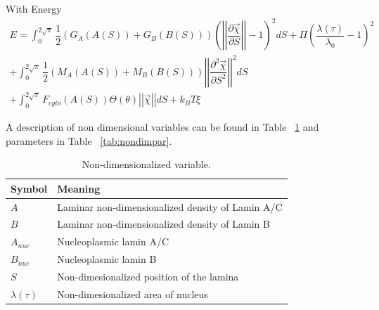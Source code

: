 With Energy 
\begin{align}
 E = \displaystyle \int_0^{2 \sqrt{\pi}} \dfrac{1}{2} (G_A(A(S))+ G_B(B(S)))\left( \left |\left|  \dfrac{\partial \vec{\chi} }{\partial S} \right|\right| - 1\right)^2  dS + \Pi \left(\dfrac{\lambda(\tau)}{\lambda_0} -1\right)^2\\[10pt]
 +\displaystyle\int_0^{2\sqrt{\pi}} \dfrac{1}{2 } (M_A(A(S))+ M_B(B(S)))\left|\left| \dfrac{\partial^2 \vec{\chi}}{\partial S^2} \right|\right|^2 dS\\[10pt]
+ \displaystyle\int_0^{2\sqrt{\pi}} F_{cyto}(A(S))\Theta (\theta) \left|\left| \vec{\chi} \right|\right| dS +k_BT \xi
\end{align}

A description of non dimensional variables can be found in Table ~\ref{tab:nondimvar} and parameters in Table ~\ref{tab:nondimpar}.

\begin{table}[t!]
\caption{Non-dimensionalized variable.}\centering \label{tab:nondimvar} 
\begin{tabular}{ l  l}
\hline
Symbol  & Meaning \\
\hline
$A$ & Laminar non-dimensionalized density of Lamin A/C \\
$B$ & Laminar non-dimensionalized density of Lamin B  \\
$A_{nuc}$ & Nucleoplasmic lamin A/C \\
$B_{nuc}$ & Nucleoplasmic lamin B\\
$S$ & Non-dimesionalized position of the lamina\\
$\lambda(\tau)$ & Non-dimesionalized area of nucleus\\
\hline
\end{tabular}
\end{table}



